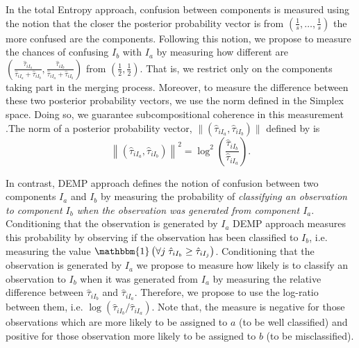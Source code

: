 \documentclass[10pt, a4paper]{article}
\begin{document}
\begin{spacing}{1.9}
In the total Entropy approach, confusion between components is measured using the notion that the closer the posterior probability vector is from $(\frac{1}{s}, \dots, \frac{1}{s})$ the more confused are the components. Following this notion, we propose to measure the chances of confusing $I_b$ with $I_a$  by measuring how different are $(\frac{\hat{\tau}_{i I_a}}{\hat{\tau}_{i I_a} + \hat{\tau}_{i I_b}}, \frac{\hat{\tau}_{i I_b}}{\hat{\tau}_{i I_a} + \hat{\tau}_{i I_b}})$ from $(\frac{1}{2}, \frac{1}{2})$. That is, we restrict only on the components taking part in the merging process. Moreover, to measure the difference between these two posterior probability vectors, we use the norm defined in the Simplex space. Doing so, we guarantee subcompositional coherence in this measurement \citep{aitchison1986statistical}.The norm of a posterior probability vector, $\| (\hat{\tau}_{iI_a}, \hat{\tau}_{iI_b}) \|$  defined by \cite{aitchison2002simplicial} is \[ \left\| (\hat{\tau}_{iI_a}, \hat{\tau}_{iI_b}) \right\|^2 = \log^2 \left(\frac{ \hat{\tau}_{iI_b} }{ \hat{\tau}_{iI_a} }\right). \] 

In contrast, DEMP approach defines the notion of confusion between two components $I_a$ and $I_b$ by measuring the probability of \emph{classifying an observation to component $I_b$ when the observation was generated from component $I_a$}. Conditioning that the observation is generated by $I_a$ DEMP approach measures this probability by observing if the observation has been classified to $I_b$, i.e.  measuring the value $\mathbbm{1}\left( \forall j\; \hat{\tau}_{i I_{b}} \geq \hat{\tau}_{i I_j} \right)$. Conditioning that the observation is generated by $I_a$ we propose to measure how likely is to classify an observation to $I_b$ when it was generated from $I_a$ by measuring the relative difference between $\hat{\tau}_{i I_b}$ and $\hat{\tau}_{i I_a}$. Therefore, we propose to use the log-ratio between them, i.e.  $\log( \hat{\tau}_{i I_b}/\hat{\tau}_{i I_a})$. Note that, the measure is negative for those observations which are more likely to be assigned to $a$ (to be well classified) and positive for those observation more likely to be assigned to $b$ (to be misclassified). %


\end{spacing}
\end{document}
